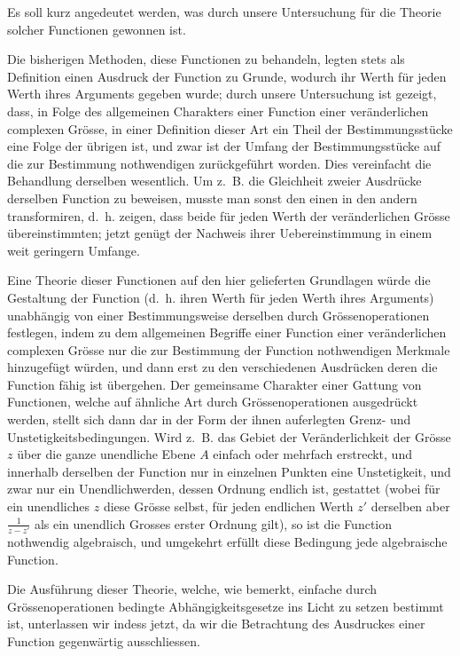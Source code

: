 \documentclass[12pt,a4paper]{book}
\theoremstyle{definition}
\theoremstyle{remark}
\begin{document}
Es soll kurz angedeutet werden, was durch unsere Untersuchung für die Theorie solcher Functionen gewonnen ist.

Die bisherigen Methoden, diese Functionen zu behandeln, legten stets als Definition einen Ausdruck der Function zu Grunde, wodurch ihr Werth für jeden Werth ihres Arguments gegeben wurde; durch unsere Untersuchung ist gezeigt, dass, in Folge des allgemeinen Charakters einer Function einer veränderlichen complexen Grösse, in einer Definition dieser Art ein Theil der Bestimmungsstücke eine Folge der übrigen ist, und zwar ist der Umfang der Bestimmungsstücke auf die zur Bestimmung nothwendigen zurückgeführt worden. Dies vereinfacht die Behandlung derselben wesentlich. Um z.~B. die Gleichheit zweier Ausdrücke derselben Function zu beweisen, musste man sonst den einen in den andern transformiren, d.~h. zeigen, dass beide für jeden Werth der veränderlichen Grösse übereinstimmten; jetzt genügt der Nachweis ihrer Uebereinstimmung in einem weit geringern Umfange.

Eine Theorie dieser Functionen auf den hier gelieferten Grundlagen würde die Gestaltung der Function (d.~h. ihren Werth für jeden Werth ihres Arguments) unabhängig von einer Bestimmungsweise derselben durch Grössenoperationen festlegen, indem zu dem allgemeinen Begriffe einer Function einer veränderlichen complexen Grösse nur die zur Bestimmung der Function nothwendigen Merkmale hinzugefügt würden, und dann erst zu den verschiedenen Ausdrücken deren die Function fähig ist übergehen. Der gemeinsame Charakter einer Gattung von Functionen, welche auf ähnliche Art durch Grössenoperationen ausgedrückt werden, stellt sich dann dar in der Form der ihnen auferlegten Grenz- und Unstetigkeitsbedingungen. Wird z.~B. das Gebiet der Veränderlichkeit der Grösse $z$ über die ganze unendliche Ebene $A$ einfach oder mehrfach erstreckt, und innerhalb derselben der Function nur in einzelnen Punkten eine Unstetigkeit, und zwar nur ein Unendlichwerden, dessen Ordnung endlich ist, gestattet (wobei für ein unendliches $z$ diese Grösse selbst, für jeden endlichen Werth $z'$ derselben aber $\frac{1}{z-z'}$ als ein unendlich Grosses erster Ordnung gilt), so ist die Function nothwendig algebraisch, und umgekehrt erfüllt diese Bedingung jede algebraische Function.

Die Ausführung dieser Theorie, welche, wie bemerkt, einfache durch Grössenoperationen bedingte Abhängigkeitsgesetze ins Licht zu setzen bestimmt ist, unterlassen wir indess jetzt, da wir die Betrachtung des Ausdruckes einer Function gegenwärtig ausschliessen.
\end{document}
